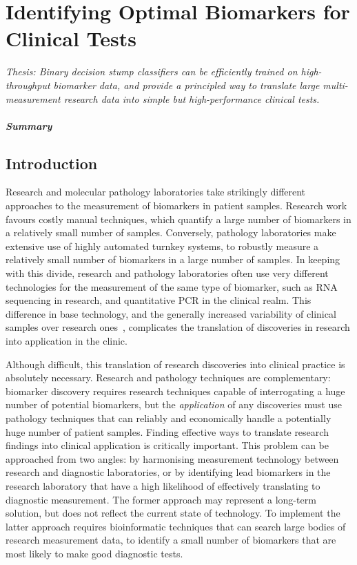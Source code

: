 \documentclass[dissertation.tex]{subfiles}
\begin{document}
\chapter[Identifying Optimal Biomarkers for Clinical Tests][Finding Optimal Biomarkers]{Identifying Optimal Biomarkers for Clinical Tests}
\label{chap:messina}


\emph{Thesis: Binary decision stump classifiers can be efficiently trained on high-throughput biomarker data, and provide a principled way to translate large multi-measurement research data into simple but high-performance clinical tests.}


\paragraph{Summary}


\section{Introduction}

Research and molecular pathology laboratories take strikingly different approaches to the measurement of biomarkers in patient samples.  Research work favours costly manual techniques, which quantify a large number of biomarkers in a relatively small number of samples.  Conversely, pathology laboratories make extensive use of highly automated turnkey systems, to robustly measure a relatively small number of biomarkers in a large number of samples.  In keeping with this divide, research and pathology laboratories often use very different technologies for the measurement of the same type of biomarker, such as RNA sequencing in research, and quantitative PCR in the clinical realm.  This difference in base technology, and the generally increased variability of clinical samples over research ones~\cite{Hewitt2008}, complicates the translation of discoveries in research into application in the clinic.

Although difficult, this translation of research discoveries into clinical practice is absolutely necessary.  Research and pathology techniques are complementary: biomarker discovery requires research techniques capable of interrogating a huge number of potential biomarkers, but the \emph{application} of any discoveries must use pathology techniques that can reliably and economically handle a potentially huge number of patient samples.  Finding effective ways to translate research findings into clinical application is critically important.  This problem can be approached from two angles: by harmonising measurement technology between research and diagnostic laboratories, or by identifying lead biomarkers in the research laboratory that have a high likelihood of effectively translating to diagnostic measurement.  The former approach may represent a long-term solution, but does not reflect the current state of technology.  To implement the latter approach requires bioinformatic techniques that can search large bodies of research measurement data, to identify a small number of biomarkers that are most likely to make good diagnostic tests.
\end{document}
